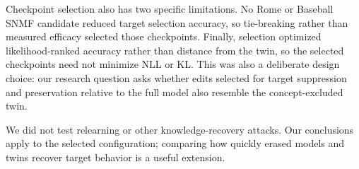 Checkpoint selection also has two specific limitations. No Rome or Baseball
SNMF candidate reduced target selection accuracy, so tie-breaking rather than
measured efficacy selected those checkpoints. Finally, selection optimized likelihood-ranked accuracy rather than distance
from the twin, so the selected checkpoints need not minimize NLL or KL. This
was also a deliberate design choice: our research question asks whether edits
selected for target suppression and preservation relative to the full model
also resemble the concept-excluded twin.

We did not test relearning or other knowledge-recovery attacks. Our conclusions
apply to the selected configuration; comparing how quickly erased models and
twins recover target behavior is a useful extension.
